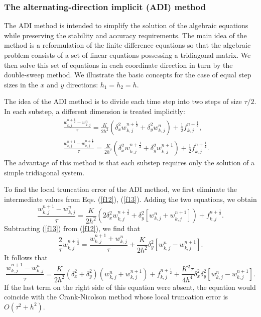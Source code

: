 \subsubsection{The alternating-direction implicit (ADI) method}
The ADI method is intended to
simplify the solution of the algebraic equations while preserving the stability
and accuracy requirements.
The main idea of the method is a reformulation of the finite difference
equations so that the algebraic problem consists of a set of linear equations
possessing a tridiagonal matrix. We then solve this set of equations in each
coordinate direction in turn by the double-sweep method.
We illustrate the basic concepts for the case of equal step sizes in
the $x$ and $y$ directions:
$h_{1}=h_{2}=h$.

\vskip 0.3cm
 
The idea of the ADI method is to divide each time step into two
steps of size $\tau/2$. In each substep, a different dimension is treated
implicitly:
\begin{eqnarray}
&&\frac{w^{n+\frac{1}{2}}_{k,j}-w^{n}_{k,j}}{\tau}=\frac{K}{2h^2}
\left(\delta^2_{x}w^{n+\frac{1}{2}}_{k,j}
+\delta^2_{y}w^{n}_{k,j}\right)+\frac{1}{2}f^{n+\frac{1}{2}}_{k,j}, \label{f12} \\
&&\frac{w^{n+1}_{k,j}-w^{n+\frac{1}{2}}_{k,j}}{\tau}=\frac{K}{2h^2}
\left(\delta^2_{x}w^{n+\frac{1}{2}}_{k,j}
+\delta^2_{y}w^{n+1}_{k,j}\right)+\frac{1}{2}f^{n+\frac{1}{2}}_{k,j}. \label{f13}
\end{eqnarray}
The advantage of this method is that each substep requires only
the solution of a simple tridiagonal system.


\vskip 0.3cm
 
To find the local truncation error of the ADI method, we first eliminate
the intermediate values from Eqs. (\ref{f12}), (\ref{f13}). Adding the two equations, we
obtain
\[
\frac{w^{n+1}_{k,j}-w^{n}_{k,j}}{\tau}=\frac{K}{2h^2}
\left(2\delta^2_{x}w^{n+\frac{1}{2}}_{k,j}
+\delta^2_{y}\left[w^{n}_{k,j}+w^{n+1}_{k,j}\right]\right)+f^{n+\frac{1}{2}}_{k,j}.
\]
Subtracting (\ref{f13}) from (\ref{f12}), we find that
\[
\frac{2}{\tau}w^{n+\frac{1}{2}}_{k,j}=\frac{w^{n+1}_{k,j}+w^{n}_{k,j}}{\tau}+
\frac{K}{2h^2}\delta^2_{y}\left[w^{n}_{k,j}-w^{n+1}_{k,j}\right].
\]
It follows that
\begin{equation}
\frac{w^{n+1}_{k,j}-w^{n}_{k,j}}{\tau}=\frac{K}{2h^2}
\left(\delta^2_{x}+\delta^2_{y}\right)\left(
w^{n}_{k,j}+w^{n+1}_{k,j}\right)+f^{n+\frac{1}{2}}_{k,j}+
\frac{K^2\tau}{4h^4}\delta^2_{x}\delta^2_{y}
\left[w^{n}_{k,j}-w^{n+1}_{k,j}\right]. \label{f14}
\end{equation}
If the last term on the right side of this equation were absent, the equation
would coincide with the Crank-Nicolson method whose local truncation
error is $O(\tau^2+h^2)$.

